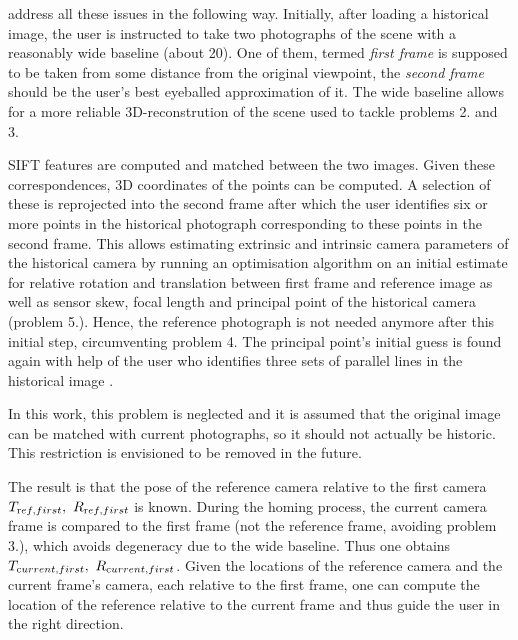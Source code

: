 \citet{bae2010} address all these issues in the following way.
Initially, after loading a historical image, the user is instructed to
take two photographs of the scene with a reasonably wide baseline (about
20\textdegree). One of them, termed \emph{first frame} is supposed to be
taken from some distance from the original viewpoint, the \emph{second
frame} should be the user's best eyeballed approximation of it. The wide
baseline allows for a more reliable 3D-reconstrution of the scene used to
tackle problems 2. and 3. 

SIFT features are computed and matched between the two images.  Given these
correspondences, 3D coordinates of the points can be computed. A selection of
these is reprojected into the second frame after which the user identifies six
or more points in the historical photograph corresponding to these points in the
second frame. This allows estimating extrinsic and intrinsic camera parameters
of the historical camera by running an optimisation algorithm on an initial
estimate for relative rotation and translation between first frame and reference
image as well as sensor skew, focal length and principal point of the historical
camera (problem 5.).  Hence, the reference photograph is not needed anymore
after this initial step, circumventing problem 4.  The principal point's initial
guess is found again with help of the user who identifies three sets of parallel
lines in the historical image \citep[see][chapter 8.8]{h&z2004}.

In this work, this problem is neglected and it is assumed that the original
image can be matched with current photographs, so it should not actually be
historic. This restriction is envisioned to be removed in the future.

The result is that the pose of the reference camera relative to the first
camera $T_{\text ref,first},~R_{\text ref,first}$ is known. During the homing
process, the current camera frame is compared to the first frame (not the
reference frame, avoiding problem 3.), which avoids degeneracy due to the wide
baseline. Thus one obtains $T_{\text current,first},~R_{\text current,first}$.
Given the locations of the reference camera and the current frame's camera, each
relative to the first frame, one can compute the location of the reference
relative to the current frame and thus guide the user in the right direction.

